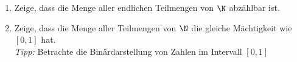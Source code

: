 \begin{prob}
  \begin{enumerate}[label=(\alph*)]
  \item Zeige, dass die Menge aller endlichen Teilmengen von $\N$ abzählbar ist.
  \item Zeige, dass die Menge aller Teilmengen von $\N$ die gleiche Mächtigkeit
    wie $[0, 1]$ hat. \\
    \textit{Tipp:} Betrachte die Binärdarstellung von Zahlen im Intervall
    $[0, 1]$
  \end{enumerate}
\end{prob}
